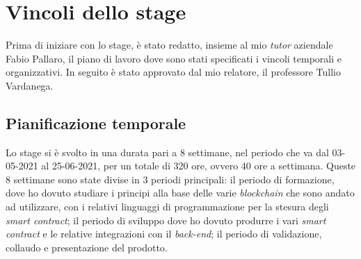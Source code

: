 
\section{Vincoli dello stage}
Prima di iniziare con lo stage, è stato redatto, insieme al mio \textit{tutor} aziendale Fabio Pallaro, il piano di lavoro dove sono stati specificati i vincoli temporali e organizzativi. In seguito è stato approvato dal mio relatore, il professore Tullio Vardanega.

\subsection{Pianificazione temporale}
Lo stage si è svolto in una durata pari a 8 settimane, nel periodo che va dal 03-05-2021 al 25-06-2021, per un totale di 320 ore, ovvero 40 ore a settimana. Queste 8 settimane sono state divise in 3 periodi principali: il periodo di formazione, dove ho dovuto studiare i principi alla base delle varie \textit{blockchain} che sono andato ad utilizzare, con i relativi linguaggi di programmazione per la stesura degli \textit{smart contract}; il periodo di sviluppo dove ho dovuto produrre i vari \textit{smart contract} e le relative integrazioni con il \textit{back-end}; il periodo di validazione, collaudo e presentazione del prodotto. \\

